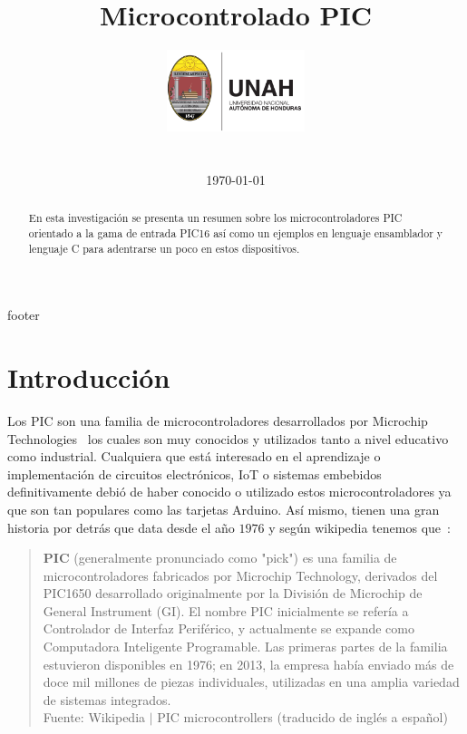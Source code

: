 \documentclass[conference]{IEEEtran}
\title{Microcontrolado PIC}
\author{
    \includegraphics[width = 40mm]{images/logo-unah}\\[8ex]
    \IEEEauthorblockN{Tobias Briones}
    \IEEEauthorblockN{tobias.briones@unah.hn}
    \IEEEauthorblockA{\textit{Universidad Nacional Autónoma de Honduras} \\
    \textit{Ingeniería de Sistemas} \\
    \textit{I PAC 2022} \\
    \textit{IS911-MICROPROCESADORES}} \\\vspace*{20pt} \normalsize  \\
    \today
}
\begin{document}
    \maketitle

    \begin{abstract}
        En esta investigación se presenta un resumen sobre los
        microcontroladores PIC orientado a la gama de entrada PIC16 así como
        un ejemplos en lenguaje ensamblador y lenguaje C para adentrarse un
        poco en estos dispositivos.
    \end{abstract}

    \tableofcontents

    {footer}

    \section{Introducción}\label{sec:introduction}

    Los PIC son una familia de microcontroladores desarrollados por Microchip
    Technologies~\cite{microchip-technology-inc-2013} los cuales son muy
    conocidos y utilizados tanto a nivel educativo como industrial.
    Cualquiera que está interesado en el aprendizaje o implementación de
    circuitos electrónicos, IoT o sistemas embebidos definitivamente debió de
    haber conocido o utilizado estos microcontroladores ya que son tan
    populares como las tarjetas Arduino. Así mismo, tienen una gran historia
    por detrás que data desde el año $1976$ y según wikipedia tenemos que~\cite{wikipedia-pic-2022}:

    \bigbreak

    \begin{quote}
        \textbf{PIC} (generalmente pronunciado como "pick") es una familia de
        microcontroladores fabricados por Microchip Technology, derivados del
        PIC1650 desarrollado originalmente por la División de Microchip de
        General Instrument (GI). El nombre PIC inicialmente se refería a
        Controlador de Interfaz Periférico, y actualmente se expande como
        Computadora Inteligente Programable. Las primeras partes de la
        familia estuvieron disponibles en 1976; en 2013, la empresa había
        enviado más de doce mil millones de piezas individuales, utilizadas
        en una amplia variedad de sistemas integrados.
        \\
        \small Fuente: Wikipedia $\mid$ PIC microcontrollers (traducido de
        inglés a español)~\cite{wikipedia-pic-2022}
    \end{quote}
\end{document}
